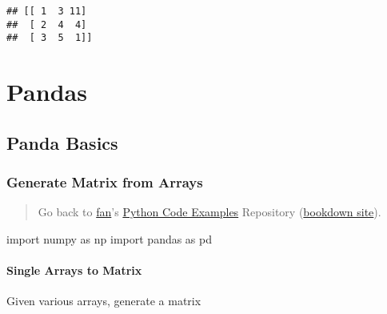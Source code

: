 \documentclass[
]{book}
\newenvironment{Shaded}{\begin{snugshade}}{\end{snugshade}}
\newcommand{\ImportTok}[1]{#1}
\newcommand{\NormalTok}[1]{#1}
\begin{document}
\begin{verbatim}
## [[ 1  3 11]
##  [ 2  4  4]
##  [ 3  5  1]]
\end{verbatim}

\hypertarget{pandas}{%
\chapter{Pandas}\label{pandas}}

\hypertarget{panda-basics}{%
\section{Panda Basics}\label{panda-basics}}

\hypertarget{generate-matrix-from-arrays-1}{%
\subsection{Generate Matrix from Arrays}\label{generate-matrix-from-arrays-1}}

\begin{quote}
Go back to \href{http://fanwangecon.github.io/}{fan}'s \href{https://fanwangecon.github.io/pyfan/}{Python Code Examples} Repository (\href{https://fanwangecon.github.io/pyfan/bookdown}{bookdown site}).
\end{quote}

\begin{Shaded}
\begin{Highlighting}[]
\ImportTok{import}\NormalTok{ numpy }\ImportTok{as}\NormalTok{ np}
\ImportTok{import}\NormalTok{ pandas }\ImportTok{as}\NormalTok{ pd}
\end{Highlighting}
\end{Shaded}

\hypertarget{single-arrays-to-matrix}{%
\subsubsection{Single Arrays to Matrix}\label{single-arrays-to-matrix}}

Given various arrays, generate a matrix
\end{document}
